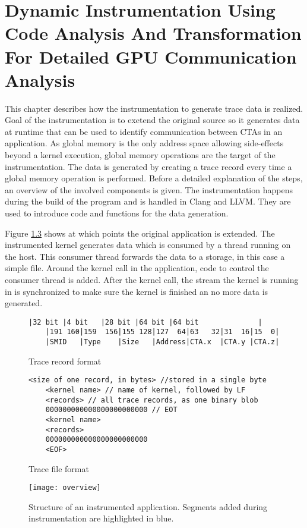 \chapter{Dynamic Instrumentation Using Code Analysis And Transformation For Detailed GPU Communication Analysis}
This chapter describes how the instrumentation to generate trace data is realized. Goal of the instrumentation is to exetend the original source so it generates data at runtime that can be used to identify communication between CTAs in an application. As global memory is the only address space allowing side-effects beyond a kernel execution, global memory operations are the target of the instrumentation. The data is generated by creating a trace record every time a global memory operation is performed.  Before a detailed explanation of the steps, an overview of the involved components is given. The instrumentation happens during the build of the program and is handled in Clang and LLVM. They are used to introduce code and functions for the data generation.

Figure \ref{overview} shows at which points the original application is extended. The instrumented kernel generates data which is consumed by a thread running on the host. This consumer thread forwards the data to a 
storage, in this case a simple file.  Around the kernel call in the application, code to control the consumer thread is added. After the kernel call, the stream the kernel is running in is synchronized to make sure the kernel is finished an no more data is generated.

\begin{figure}[h!]
	\begin{lstlisting}[style=C]
	|32 bit |4 bit   |28 bit |64 bit |64 bit        	  |
	|191 160|159  156|155 128|127  64|63   32|31  16|15  0|
	|SMID   |Type    |Size   |Address|CTA.x  |CTA.y |CTA.z|	\end{lstlisting}
	\caption{Trace record format}
	\label{trace rec}
\end{figure}
\begin{figure}[h]
	\begin{lstlisting}[style=C]
	<size of one record, in bytes> //stored in a single byte
	<kernel name> // name of kernel, followed by LF
	<records> // all trace records, as one binary blob
	000000000000000000000000 // EOT
	<kernel name>
	<records>
	000000000000000000000000
	<EOF>	\end{lstlisting}
	\caption{Trace file format}
	\label{trace file}
\end{figure}
\begin{figure}[t]
	\centering
	\texttt{[image: overview]}
	\caption{Structure of an instrumented application. Segments added during instrumentation are highlighted in blue.}
	\label{overview}
\end{figure}

